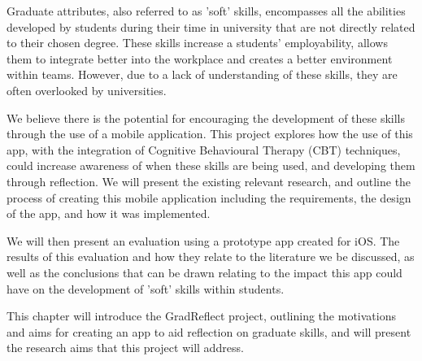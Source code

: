 \documentclass{l4proj}
\begin{document}
Graduate attributes, also referred to as 'soft' skills, encompasses all the abilities 
developed by students during their time in university that are not directly related to
their chosen degree. These skills increase a students’ employability, allows them to 
integrate better into the workplace and creates a better environment within teams. However,
due to a lack of understanding of these skills, they are often overlooked by universities.
\par 
We believe there is the potential for encouraging the development of these skills through
the use of a mobile application. This project explores how the use of this app, with the
integration of Cognitive Behavioural Therapy (CBT) techniques, could increase awareness 
of when these skills are being used, and developing them through reflection. We will 
present the existing relevant research, and outline the process of creating this 
mobile application including the requirements, the design of the app, and how it was 
implemented.
\par 
We will then present an evaluation using a prototype app created for iOS. The results of
this evaluation and how they relate to the literature we be discussed, as well as the 
conclusions that can be drawn relating to the impact this app could have on the development
of 'soft' skills within students.
\par 
This chapter will introduce the GradReflect project, outlining the motivations and aims 
for creating an app to aid reflection on graduate
skills, and will present the research aims that this project will address.
\end{document}

